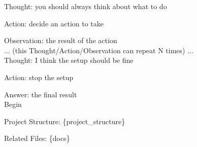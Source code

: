 \begin{tcolorbox}[colback=gray!5,colframe=black!50,fontupper=\ttfamily,title=Prompt for Setup Agent]
Thought: you should always think about what to do

Action: decide an action to take

Observation: the result of the action
\\

... (this Thought/Action/Observation can repeat N times) ...
\\

Thought: I think the setup should be fine

Action: stop the setup

Answer: the final result\\

Begin

Project Structure: \{project\_structure\}

Related Files: \{docs\}
\end{tcolorbox}

